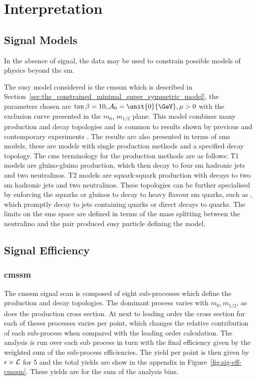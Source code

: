 \chapter{Interpretation} %
\label{cha:interpretation}


\section{Signal Models} %
\label{sec:signal_models}
In the absence of signal, the data may be used to constrain possible models of physics beyond the \ac{sm}.

The \ac{susy} model considered is the \ac{cmssm}\cite{ref:CMSSM} which is 
described in Section~\ref{sec:the_constrained_minimal_super_symmetric_model}, 
the parameters chosen are $\tan\beta = 10, \mathcal{A}_{0} = \unit{0}{\GeV}, 
\mu > 0$ with the exclusion curve presented in the $m_{0}$, $m_{1/2}$ plane. 
This model combines many production and decay topologies and is common to 
results shown by previous and contemporary experiments \cite{RA1Paper2011, 
RA1Paper, cms1, cms2, cms3, atlas2, atlas3, atlas4, atlas1, D0Limits, 
CDFLimits, LEPLimits, UA1Limits, UA2Limits}.
The results are also presented in terms of \ac{sms} models, these are 
models with single production methods and a specified decay topology. The 
\ac{cms} terminology for the production methods are as follows: T1 models are 
gluino-gluino production, which then decay to four \ac{sm} hadronic jets and 
two neutralinos. T2 models are squark-squark production with decays to two 
\ac{sm} hadronic jets and two neutralinos.
These topologies can be further specialised by enforcing the squarks or gluinos 
to decay to heavy flavour \ac{sm} quarks, such as \Ptop, which promptly decay 
to jets containing \Pbottom quarks or direct decays to \Pbottom quarks. The 
limits on the \ac{sms} space are defined in terms of the mass splitting between 
the neutralino and the pair produced \ac{susy} particle defining the model.
\section{Signal Efficiency} %
\label{sub:signal_efficiency}
\subsection{\ac{cmssm}} %
\label{par:cmssm}
The \ac{cmssm} signal scan is composed of eight sub-processes which define the 
production and decay topologies. The dominant process varies with $m_{0}, 
m_{1/2}$, as does the production cross section. At next to leading order the 
cross section for each of theses processes varies per point, which changes the 
relative contribution of each sub-process when compared with the leading order 
calculation. The analysis is run over each sub process in turn with the final 
efficiency given by the weighted sum of the sub-process efficiencies. The yield 
per point is then given by $\epsilon\time\sigma\times\mathcal{L}$ for 
\unit{5}{\invfb} and the total yields are show in the appendix in 
Figure~\ref{fig:sig-eff-cmssm}. These yields are for the sum of the \HT 
analysis bins.

